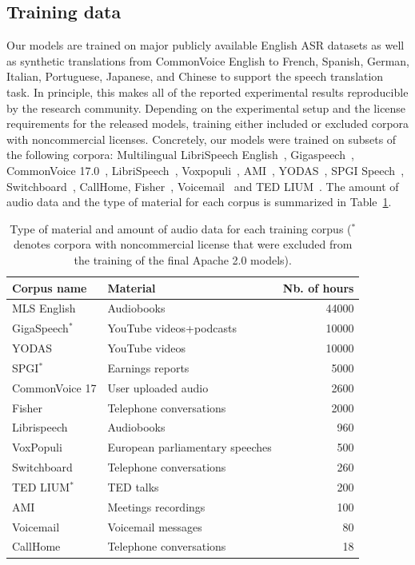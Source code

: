 \documentclass[9pt,conference]{IEEEtran}
\begin{document}
\subsection{Training data}
Our models are trained on major publicly available English ASR datasets as well as synthetic translations from CommonVoice English to French, Spanish, German, Italian, Portuguese, Japanese, and Chinese to support the speech translation task. In principle, this makes all of the reported experimental results reproducible by the research community. Depending on the experimental setup and the license requirements for the released models, training either included or excluded corpora with noncommercial licenses. Concretely, our models were trained on subsets of the following corpora: Multilingual LibriSpeech English~\cite{pratap2020mls}, Gigaspeech~\cite{chen2021gigaspeech}, CommonVoice 17.0~\cite{ardila2019common}, LibriSpeech~\cite{panayotov2015librispeech}, Voxpopuli~\cite{wang2021voxpopuli}, AMI~\cite{kraaij2005ami}, YODAS~\cite{li2023yodas}, SPGI Speech~\cite{o2021spgispeech}, Switchboard~\cite{godfrey1992switchboard}, CallHome, Fisher~\cite{cieri2004fisher}, Voicemail~\cite{padmanabhan2002automatic} and TED LIUM~\cite{rousseau2012ted}. The amount of audio data and the type of material for each corpus is summarized in Table~\ref{corpora}. 

\begin{table}[htb]
\begin{center}
\begin{tabular}{|l|l|r|} \hline
Corpus name & Material & Nb. of hours\\ \hline
MLS English & Audiobooks & 44000\\ \hline
GigaSpeech$^*$ & YouTube videos+podcasts & 10000\\ \hline
YODAS & YouTube videos & 10000\\ \hline
SPGI$^*$ & Earnings reports & 5000\\ \hline
CommonVoice 17 & User uploaded audio & 2600\\ \hline
Fisher & Telephone conversations & 2000\\ \hline
Librispeech & Audiobooks & 960\\ \hline
VoxPopuli & European parliamentary speeches & 500\\ \hline
Switchboard & Telephone conversations & 260\\ \hline
TED LIUM$^*$ & TED talks & 200\\ \hline
AMI & Meetings recordings & 100\\ \hline
Voicemail & Voicemail messages & 80\\ \hline
CallHome & Telephone conversations & 18\\ \hline
\end{tabular}
\end{center}
\caption{\label{corpora} Type of material and amount of audio data for each training corpus ($^*$ denotes corpora with noncommercial license that were excluded from the training of the final Apache 2.0 models).}
\end{table}
\end{document}
